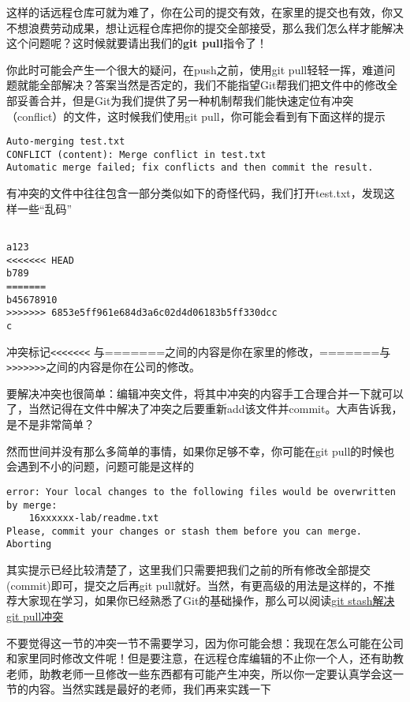 这样的话远程仓库可就为难了，你在公司的提交有效，在家里的提交也有效，你又不想浪费劳动成果，想让远程仓库把你的提交全部接受，那么我们怎么样才能解决这个问题呢？这时候就要请出我们的\textbf{git pull}指令了！

你此时可能会产生一个很大的疑问，在push之前，使用git pull轻轻一挥，难道问题就能全部解决？答案当然是否定的，我们不能指望Git帮我们把文件中的修改全部妥善合并，但是Git为我们提供了另一种机制帮我们能快速定位有冲突（conflict）的文件，这时候我们使用git pull，你可能会看到有下面这样的提示

\begin{verbatim}
Auto-merging test.txt
CONFLICT (content): Merge conflict in test.txt
Automatic merge failed; fix conflicts and then commit the result.
\end{verbatim}

有冲突的文件中往往包含一部分类似如下的奇怪代码，我们打开test.txt，发现这样一些“乱码”

\begin{verbatim}

a123
<<<<<<< HEAD
b789
=======
b45678910
>>>>>>> 6853e5ff961e684d3a6c02d4d06183b5ff330dcc
c
\end{verbatim}

冲突标记\verb|<<<<<<<| 与=======之间的内容是你在家里的修改，=======与\verb|>>>>>>>|之间的内容是你在公司的修改。

要解决冲突也很简单：编辑冲突文件，将其中冲突的内容手工合理合并一下就可以了，当然记得在文件中解决了冲突之后要重新add该文件并commit。大声告诉我，是不是非常简单？

然而世间并没有那么多简单的事情，如果你足够不幸，你可能在git pull的时候也会遇到不小的问题，问题可能是这样的

\begin{verbatim}
error: Your local changes to the following files would be overwritten by merge:
	16xxxxxx-lab/readme.txt
Please, commit your changes or stash them before you can merge.
Aborting
\end{verbatim}

其实提示已经比较清楚了，这里我们只需要把我们之前的所有修改全部提交(commit)即可，提交之后再git pull就好。当然，有更高级的用法是这样的，不推荐大家现在学习，如果你已经熟悉了Git的基础操作，那么可以阅读\href{http://www.01happy.com/git-resolve-conflicts/}{git stash解决git pull冲突}

不要觉得这一节的冲突一节不需要学习，因为你可能会想：我现在怎么可能在公司和家里同时修改文件呢！但是要注意，在远程仓库编辑的不止你一个人，还有助教老师，助教老师一旦修改一些东西都有可能产生冲突，所以你一定要认真学会这一节的内容。当然实践是最好的老师，我们再来实践一下

